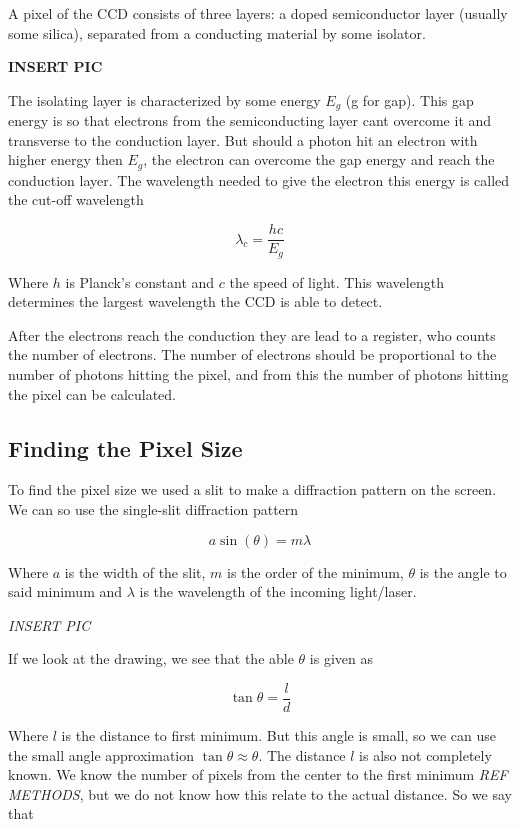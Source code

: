 \documentclass{emulateapj}
\begin{document}
A pixel of the CCD consists of three layers: a doped semiconductor layer (usually some silica), separated from a conducting material by some isolator. 

\textbf{INSERT PIC}


The isolating layer is characterized by some energy $E_g$ (g for gap). This gap energy is so that electrons from the semiconducting layer cant overcome it and transverse to the conduction layer. But should a photon hit an electron with higher energy then $E_g$, the electron can overcome the gap energy and reach the conduction layer. The wavelength needed to give the electron this energy is called the cut-off wavelength

\begin{equation}
\lambda_{c} = \frac{hc}{E_g}
\end{equation}

Where $h$ is Planck's constant and $c$ the speed of light. This wavelength determines the largest wavelength the CCD is able to detect. 

After the electrons reach the conduction they are lead to a register, who counts the number of electrons. The number of electrons should be proportional to the number of photons hitting the pixel, and from this the number of photons hitting the pixel can be calculated.


\subsection{Finding the Pixel Size}
To find the pixel size we used a slit to make a diffraction pattern on the screen. We can so use the single-slit diffraction pattern

\begin{equation}
a \sin(\theta) = m\lambda
\label{eq:diffPatt}
\end{equation}

Where $a$ is the width of the slit, $m$ is the order of the minimum, $\theta$ is the angle to said minimum and $\lambda$ is the wavelength of the incoming light/laser.

\emph{INSERT PIC}

If we look at the drawing, we see that the able $\theta$ is given as

\begin{equation}
\tan \theta = \frac{l}{d}
\end{equation}

Where $l$ is the distance to first minimum. But this angle is small, so we can use the small angle approximation $\tan \theta \approx \theta$. The distance $l$ is also not completely known. We know the number of pixels from the center to the first minimum \emph{REF METHODS}, but we do not know how this relate to the actual distance. So we say that
\end{document}
